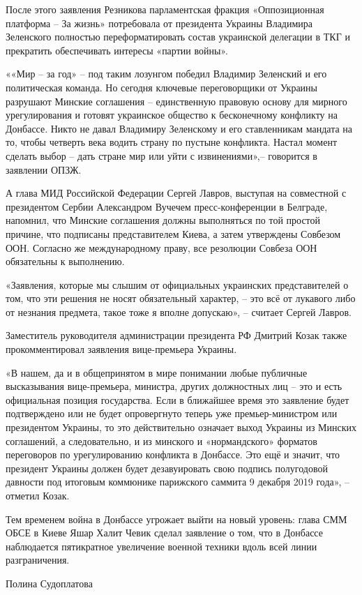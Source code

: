 После этого заявления Резникова парламентская фракция «Оппозиционная платформа
– За жизнь» потребовала от президента Украины Владимира Зеленского полностью
переформатировать состав украинской делегации в ТКГ и прекратить обеспечивать
интересы «партии войны».

««Мир – за год» – под таким лозунгом победил Владимир Зеленский и его
политическая команда. Но сегодня ключевые переговорщики от Украины разрушают
Минские соглашения – единственную правовую основу для мирного урегулирования и
готовят украинское общество к бесконечному конфликту на Донбассе. Никто не
давал Владимиру Зеленскому и его ставленникам мандата на то, чтобы четверть
века водить страну по пустыне конфликта. Настал момент сделать выбор – дать
стране мир или уйти с извинениями»,– говорится в заявлении ОПЗЖ.

А глава МИД Российской Федерации Сергей Лавров, выступая на совместной с
президентом Сербии Александром Вучечем пресс-конференции в Белграде, напомнил,
что Минские соглашения должны выполняться по той простой причине, что подписаны
представителем Киева, а затем утверждены Совбезом ООН. Согласно же
международному праву, все резолюции Совбеза ООН обязательны к выполнению.

«Заявления, которые мы слышим от официальных украинских представителей о том,
что эти решения не носят обязательный характер, – это всё от лукавого либо от
незнания предмета, такое тоже я вполне допускаю», – считает Сергей Лавров.

Заместитель руководителя администрации президента РФ Дмитрий Козак также
прокомментировал заявления вице-премьера Украины.

«В нашем, да и в общепринятом в мире понимании любые публичные высказывания
вице-премьера, министра, других должностных лиц – это и есть официальная
позиция государства. Если в ближайшее время это заявление будет подтверждено
или не будет опровергнуто теперь уже премьер-министром или президентом Украины,
то это действительно означает выход Украины из Минских соглашений, а
следовательно, и из минского и «нормандского» форматов переговоров по
урегулированию конфликта в Донбассе. Это ещё и значит, что президент Украины
должен будет дезавуировать свою подпись полугодовой давности под итоговым
коммюнике парижского саммита 9 декабря 2019 года», – отметил Козак.

Тем временем война в Донбассе угрожает выйти на новый уровень: глава СММ ОБСЕ в
Киеве Яшар Халит Чевик сделал заявление о том, что в Донбассе наблюдается
пятикратное увеличение военной техники вдоль всей линии разграничения.

Полина Судоплатова
  
